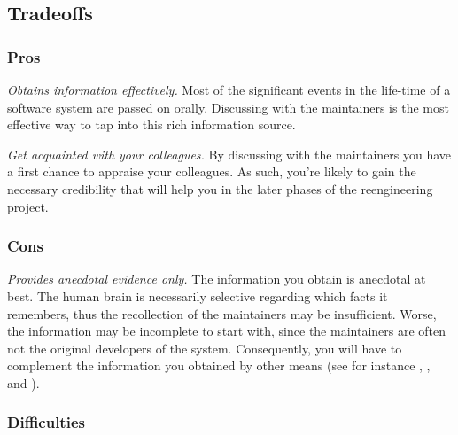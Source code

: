 \documentclass[a4paper,10pt,twoside]{book}
\begin{document}
\subsection*{Tradeoffs}

\subsubsection*{Pros}
\begin{bulletlist}
  \item \emph{Obtains information effectively.}
Most of the significant events in the life-time of a software system are passed on orally. Discussing with the maintainers is the most effective way to tap into this rich information source.

  \item \emph{Get acquainted with your colleagues.}
By discussing with the maintainers you have a first chance to appraise your colleagues. As such, you're likely to gain the necessary credibility that will help you in the later phases of the reengineering project.

\end{bulletlist}

\subsubsection*{Cons}

\begin{bulletlist}
  \item \emph{Provides anecdotal evidence only.}
The information you obtain is anecdotal at best. The human brain is necessarily selective regarding which facts it remembers, thus the recollection of the maintainers may be insufficient. Worse, the information may be incomplete to start with, since the maintainers are often not the original developers of the system. Consequently, you will have to complement the information you obtained by other means (see for instance , ,  and ).

\end{bulletlist}

\subsubsection*{Difficulties}
\end{document}

